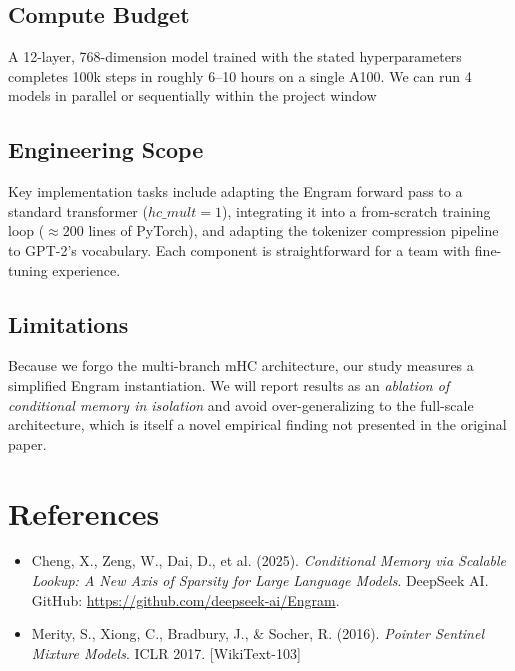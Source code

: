 \documentclass[11pt]{article}
\begin{document}
\subsection{Compute Budget}
A 12-layer, 768-dimension model trained with the stated hyperparameters completes 100k steps in roughly 6--10 hours on a single A100. We can run 4 models
in parallel or sequentially within the project window

\subsection{Engineering Scope}
Key implementation tasks include adapting the Engram forward pass to a standard transformer (\(hc\_mult = 1\)), integrating it into a from-scratch training loop (\(\approx 200\) lines of PyTorch), and adapting the tokenizer compression pipeline to GPT-2's vocabulary. Each component is straightforward for a team with fine-tuning experience.

\subsection{Limitations}
Because we forgo the multi-branch mHC architecture, our study measures a simplified Engram instantiation. We will report results as an \emph{ablation of conditional memory in isolation} and avoid over-generalizing to the full-scale architecture, which is itself a novel empirical finding not presented in the original paper.

\section{References}

\begin{itemize}
    \item Cheng, X., Zeng, W., Dai, D., et al. (2025). \emph{Conditional Memory via Scalable Lookup: A New Axis of Sparsity for Large Language Models}. DeepSeek AI. GitHub: \url{https://github.com/deepseek-ai/Engram}.
    \item Merity, S., Xiong, C., Bradbury, J., \& Socher, R. (2016). \emph{Pointer Sentinel Mixture Models}. ICLR 2017. [WikiText-103]
\end{itemize}
\end{document}
